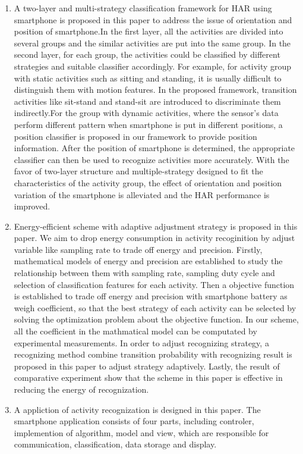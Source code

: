 \begin{enabstract}
\begin{enumerate}[(1)]
	\item A two-layer and multi-strategy classification framework for HAR using smartphone is proposed in this paper to address the issue of orientation and position of smartphone.In the first layer, all the activities are divided into several groups and the similar activities are put into the same group. In the second layer, for each group, the activities could be classified by different strategies and suitable classifier accordingly. For example, for activity group with static activities such as sitting and standing, it is usually difficult to distinguish them with motion features. In the proposed framework, transition activities like sit-stand and stand-sit are introduced to discriminate them indirectly.For the group with dynamic activities, where the sensor’s data perform different pattern when smartphone is put in different positions, a position classifier is proposed in our framework to provide position information. After the position of smartphone is determined, the appropriate classifier can then be used to recognize activities more accurately. With the favor of two-layer structure and multiple-strategy designed to fit the characteristics of the activity group, the effect of orientation and position variation of the smartphone is alleviated and the HAR performance is improved.
	\item Energy-efficient scheme with adaptive adjustment strategy is proposed in this paper. We aim to drop energy consumption in activity recoginition by adjust variable like sampling rate to trade off energy and precision. Firstly, mathematical models of energy and precision are established to study the relationship between them with sampling rate, sampling duty cycle and selection of classification features for each activity. Then a objective function is established to trade off energy and precision with smartphone battery as weigh coefficient, so that the best strategy of each activity can be selected by solving the optimization problem about the objective function. In our scheme, all the coefficient in the mathmatical model can be computated by experimental measurements. In order to adjust recognizing strategy, a recognizing method combine transition probability with recognizing result is proposed in this paper to adjust strategy adaptively. Lastly, the result of comparative experiment show that the scheme in this paper is effective in reducing the energy of recognization.
	\item A appliction of activity recognization is designed in this paper. The smartphone application consists of four parts, including controler, implemention of algorithm, model and view, which are responsible for communication, classification, data storage and display.
 \end{enumerate}
\end{enabstract}
